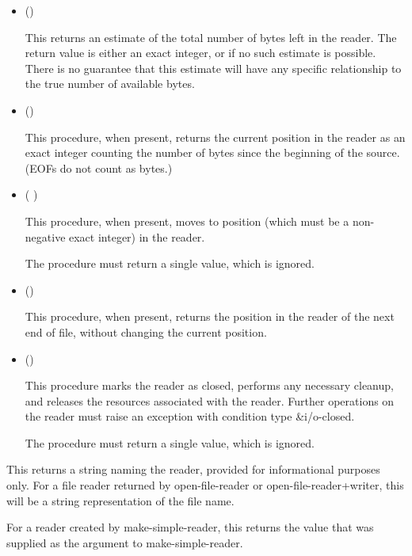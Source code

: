 \begin{entry}{%
}
\begin{itemize}
   may or may not be a bytes object returned by {\cf
    make-i/o-buffer}. It is possible that {\cf reader-read!} operates
  more efficiently if it is, however.
  
   may or may not be the same as the chunk size of the
  reader. It is possible that {\cf reader-read!} operates more
  efficiently if it is, however.

\item {\cf ()}
       
  This returns an estimate of the total number of bytes left in the
  reader. The return value is either an exact integer, or
  \schfalse{} if no such estimate is possible. There is no guarantee
  that this estimate will have any specific relationship to the true
  number of available bytes.

\item {\cf ()}
       
  This procedure, when present, returns the current position in the 
  reader as an exact integer counting the number of bytes since the
  beginning of the source. (EOFs do not count as bytes.)
  
\item {\cf ( )}
       
  This procedure, when present, moves to position  (which
  must be a non-negative exact integer) in the reader.
       
  The procedure must return a single value, which is ignored.
       
\item {\cf ()}
       
  This procedure, when present, returns the position in the reader
  of the next end of file, without changing the current position.

\item {\cf ()}
       
  This procedure marks the reader as closed, performs any necessary
  cleanup, and releases the resources associated with the reader.
  Further operations on the reader must raise an exception with
  condition type {\cf\&i/o-closed}.
       
  The procedure must return a single value, which is ignored.
\end{itemize}

\end{entry}

\begin{entry}{%
}
   
This returns a string naming the reader, provided for informational
purposes only. For a file reader returned by {\cf open-file-reader} or
{\cf open-file-reader+writer}, this will be a string representation of the file
name.
  
For a reader created by {\cf make-simple-reader}, this returns the value that was
supplied as the  argument to {\cf make-simple-reader}.
\end{entry}


